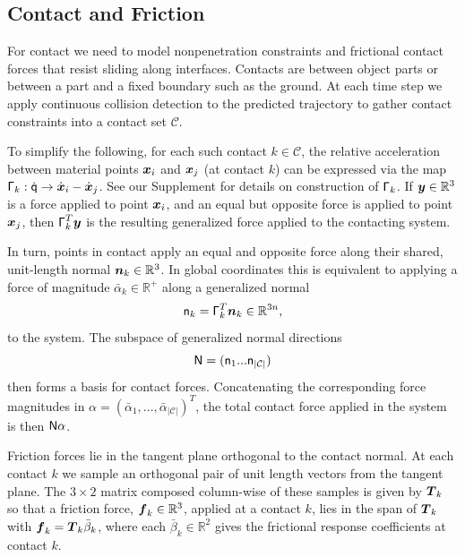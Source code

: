 \subsection{Contact and Friction} For contact we need to model nonpenetration constraints and frictional contact forces that resist sliding along interfaces. 
Contacts are between object parts or between a part and a fixed boundary such as the ground.  At each time step we apply continuous collision detection to the predicted trajectory to gather contact constraints into a contact set $\mathcal C$. 

To simplify the following, for each such contact $k \in \mathcal C$, the relative acceleration between material points $\mbox{$\bm{x}$}_i$ and $\mbox{$\bm{x}$}_j$ (at contact $k$) can be expressed via the map $\mbox{\textbf{{$\mathsf \Gamma$}}}_k: \dot{\mbox{\textbf{{$\mathsf q$}}}} \rightarrow \dot{\mbox{$\bm{x}$}}_i - \dot{\mbox{$\bm{x}$}}_j$. See our Supplement
for details on construction of $\mbox{\textbf{{$\mathsf \Gamma$}}}_k$. If $\mbox{$\bm{y}$} \in \mathbb{R}^3$ is a force applied to point $\mbox{$\bm{x}$}_i$, and an equal but opposite force is applied to point $\mbox{$\bm{x}$}_j$, then $ \mbox{\textbf{{$\mathsf \Gamma$}}}_k ^T \mbox{$\bm{y}$}$ is the resulting generalized force applied to the contacting system.

In turn, points in contact apply an equal and opposite force along their shared, unit-length normal $\mbox{$\bm{n}$}_k \in \mathbb{R}^3$.  In global coordinates this is equivalent to applying a force of magnitude $\bar{\alpha}_k \in \mathbb{R}^+$ along a generalized normal 
\begin{equation}
\mbox{\textbf{{$\mathsf n$}}}_k = \mbox{\textbf{{$\mathsf \Gamma$}}}_k^T \mbox{$\bm{n}$}_k \in \mathbb{R}^{3n},
\end{equation}
to the system. The subspace of generalized normal directions
\begin{equation}
\label{eq:N}
\mbox{\textbf{{$\mathsf N$}}} = (\mbox{\textbf{{$\mathsf n$}}}_1 ... \mbox{\textbf{{$\mathsf n$}}}_{|\mathcal C|})
\end{equation}
then forms a basis for contact forces. Concatenating the corresponding force magnitudes in  
$\alpha = (\bar{\alpha}_1, ..., \bar{\alpha}_{|\mathcal{C}|})^T$, the total contact force applied in the system is then $\mbox{\textbf{{$\mathsf N$}}} \alpha$. 

Friction forces lie in the tangent plane orthogonal to the contact normal. At each contact $k$ we sample an orthogonal pair of unit length vectors from the tangent plane. The $3\times2$ matrix composed column-wise of these samples is given by $\mbox{$\bm{T}$}_k$ so that a friction force, $\mbox{$\bm{f}$}_k \in \mathbb{R}^3$, applied at a contact $k$, lies in the span of $\mbox{$\bm{T}$}_k$ with $\mbox{$\bm{f}$}_k = \mbox{$\bm{T}$}_k \bar{\beta}_k$, where each $\bar{\beta}_k \in \mathbb{R}^2$ gives the frictional response coefficients at contact $k$.

